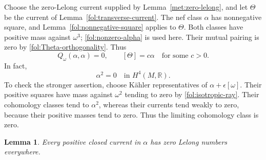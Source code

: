 \documentclass[11pt,letterpaper]{article}
\newcommand{\R}{\mathbb{R}}
\newtheorem{lemma}[theorem]{Lemma}
\theoremstyle{definition}
\theoremstyle{remark}
\begin{document}
Choose the zero-Lelong current supplied by
Lemma~\ref{met:zero-lelong}, and let $\Theta$ be the current of
Lemma~\ref{fol:transverse-current}.  The nef class $\alpha$ has
nonnegative square, and Lemma~\ref{fol:nonnegative-square} applies to
$\Theta$.  Both classes have positive mass against $\omega^3$;
\eqref{fol:nonzero-alpha} is used here.  Their mutual pairing is zero by
\eqref{fol:Theta-orthogonality}.  Thus
\begin{equation}\label{fol:isotropic-ray}
 Q_\omega(\alpha,\alpha)=0,\qquad [\Theta]=c\alpha
 \quad\text{for some }c>0.
\end{equation}
In fact,
\begin{equation}\label{fol:alpha-square-zero}
 \alpha^2=0\quad\text{in }H^4(M,\R).
\end{equation}
To check the stronger assertion, choose K\"ahler representatives of
$\alpha+\epsilon[\omega]$.  Their positive squares have mass against
$\omega^2$ tending to zero by \eqref{fol:isotropic-ray}.  Their
cohomology classes tend to $\alpha^2$, whereas their currents tend
weakly to zero, because their positive masses tend to zero.  Thus the
limiting cohomology class is zero.

\begin{lemma}\label{fol:all-zero-Lelong}
Every positive closed current in $\alpha$ has zero Lelong numbers
everywhere.
\end{lemma}
\end{document}
